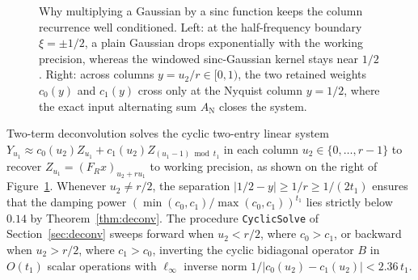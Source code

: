 \begin{figure}[t]
{%
}
\caption{Why multiplying a Gaussian by a sinc function keeps the column recurrence well conditioned. Left: at the half-frequency boundary $\xi = \pm 1/2$, a plain Gaussian drops exponentially with the working precision, whereas the windowed sinc-Gaussian kernel stays near $1/2$. Right: across columns $y = u_2 / r \in [0, 1)$, the two retained weights $c_0(y)$ and $c_1(y)$ cross only at the Nyquist column $y = 1/2$, where the exact input alternating sum $A_{\mathrm{N}}$ closes the system.}
\label{fig:kernel}
\end{figure}

Two-term deconvolution solves the cyclic two-entry linear system $Y_{u_1} \approx c_0(u_2) Z_{u_1} + c_1(u_2) Z_{(u_1 - 1)\bmod t_1}$ in each column $u_2 \in \{0, \dots, r-1\}$ to recover $Z_{u_1} = (F_R x)_{u_2 + r u_1}$ to working precision, as shown on the right of Figure~\ref{fig:kernel}. Whenever $u_2 \ne r/2$, the separation $|1/2 - y| \ge 1/r \ge 1/(2 t_1)$ ensures that the damping power $(\min(c_0, c_1)/\max(c_0, c_1))^{t_1}$ lies strictly below $0.14$ by Theorem~\ref{thm:deconv}. The procedure \texttt{CyclicSolve} of Section~\ref{sec:deconv} sweeps forward when $u_2 < r/2$, where $c_0 > c_1$, or backward when $u_2 > r/2$, where $c_1 > c_0$, inverting the cyclic bidiagonal operator $B$ in $O(t_1)$ scalar operations with $\ell_\infty$ inverse norm $1 / |c_0(u_2) - c_1(u_2)| < 2.36\, t_1$.

